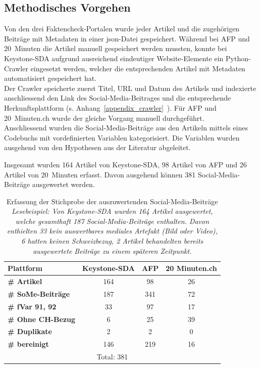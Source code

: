 \documentclass[12pt,a4paper]{article}        %
\begin{document}
\subsection{Methodisches Vorgehen}
Von den drei Faktencheck-Portalen wurde jeder Artikel und die zugehörigen Beiträge mit Metadaten in einer json-Datei gespeichert. Während bei AFP und 20 Minuten die Artikel manuell gespeichert werden mussten, konnte bei Keystone-SDA aufgrund ausreichend eindeutiger Website-Elemente ein Python-Crawler eingesetzt werden, welcher die entsprechenden Artikel mit Metadaten automatisiert gespeichert hat.\\
Der Crawler speicherte zuerst Titel, URL und Datum des Artikels und indexierte anschliessend den Link des Social-Media-Beitrages und die entsprechende Herkunftsplattform (s. Anhang~\ref{appendix_crawler}~). Für AFP und 20 Minuten.ch wurde der gleiche Vorgang manuell durchgeführt.\\
Anschliessend wurden die Social-Media-Beiträge aus den Artikeln mittels eines Codebuchs mit vordefinierten Variablen kategorisiert. Die Variablen wurden ausgehend von den Hypothesen aus der Literatur abgeleitet.

Insgesamt wurden 164 Artikel von Keystone-SDA, 98 Artikel von AFP und 26 Artikel von 20 Minuten erfasst. Davon ausgehend können 381 Social-Media-Beiträge ausgewertet werden.

\begin{table}[H]
  \label{tab:method_sample}
  \centering
  \begin{tabular}{|l|c|c|c|}
    \hline
    \textbf{Plattform} & \textbf{Keystone-SDA} & \textbf{AFP} & \textbf{20 Minuten.ch} \\
    \hline
    \textbf{\# Artikel} & 164 & 98 & 26 \\
    \hline
    \textbf{\# SoMe-Beiträge} & 187 & 341 & 72 \\
    \hline
    \textbf{\# fVar 91, 92} & 33 & 97 & 17 \\
    \hline
    \textbf{\# Ohne CH-Bezug} & 6 & 25 & 39 \\
    \hline
    \textbf{\# Duplikate} & 2 & 2 & 0 \\
    \hline
    \textbf{\# bereinigt} & 146 & 219 & 16 \\
    \hline
    \multicolumn{4}{|c|}{Total: 381} \\
    \hline
  \end{tabular}
  \caption[Erfassung der Stichprobe der auszuwertenden Social-Media-Beiträge]{Erfassung der Stichprobe der auszuwertenden Social-Media-Beiträge \linebreak \textit{Lesebeispiel: Von Keystone-SDA wurden 164 Artikel ausgewertet, welche gesamthaft 187 Social-Media-Beiträge enthalten. Davon enthielten 33 kein auswertbares mediales Artefakt (Bild oder Video), 6 hatten keinen Schweizbezug, 2 Artikel behandelten bereits ausgewertete Beiträge zu einem späteren Zeitpunkt.}}
\end{table}
\end{document}
